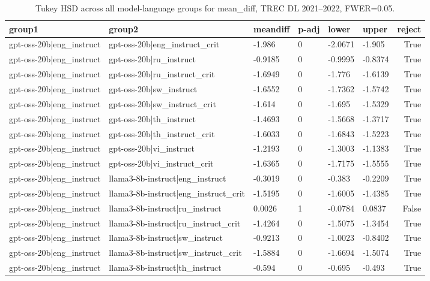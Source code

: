 \begin{table}
\caption{Tukey HSD across all model-language groups for mean_diff, TREC DL 2021--2022, FWER=0.05.}
\label{tab:tukey_all_models_all_langs_2021_2022_mean_diff}
\begin{tabular}{llllllr}
\toprule
group1 & group2 & meandiff & p-adj & lower & upper & reject \\
\midrule
gpt-oss-20b|eng_instruct & gpt-oss-20b|eng_instruct_crit & -1.986 & 0 & -2.0671 & -1.905 & True \\
gpt-oss-20b|eng_instruct & gpt-oss-20b|ru_instruct & -0.9185 & 0 & -0.9995 & -0.8374 & True \\
gpt-oss-20b|eng_instruct & gpt-oss-20b|ru_instruct_crit & -1.6949 & 0 & -1.776 & -1.6139 & True \\
gpt-oss-20b|eng_instruct & gpt-oss-20b|sw_instruct & -1.6552 & 0 & -1.7362 & -1.5742 & True \\
gpt-oss-20b|eng_instruct & gpt-oss-20b|sw_instruct_crit & -1.614 & 0 & -1.695 & -1.5329 & True \\
gpt-oss-20b|eng_instruct & gpt-oss-20b|th_instruct & -1.4693 & 0 & -1.5668 & -1.3717 & True \\
gpt-oss-20b|eng_instruct & gpt-oss-20b|th_instruct_crit & -1.6033 & 0 & -1.6843 & -1.5223 & True \\
gpt-oss-20b|eng_instruct & gpt-oss-20b|vi_instruct & -1.2193 & 0 & -1.3003 & -1.1383 & True \\
gpt-oss-20b|eng_instruct & gpt-oss-20b|vi_instruct_crit & -1.6365 & 0 & -1.7175 & -1.5555 & True \\
gpt-oss-20b|eng_instruct & llama3-8b-instruct|eng_instruct & -0.3019 & 0 & -0.383 & -0.2209 & True \\
gpt-oss-20b|eng_instruct & llama3-8b-instruct|eng_instruct_crit & -1.5195 & 0 & -1.6005 & -1.4385 & True \\
gpt-oss-20b|eng_instruct & llama3-8b-instruct|ru_instruct & 0.0026 & 1 & -0.0784 & 0.0837 & False \\
gpt-oss-20b|eng_instruct & llama3-8b-instruct|ru_instruct_crit & -1.4264 & 0 & -1.5075 & -1.3454 & True \\
gpt-oss-20b|eng_instruct & llama3-8b-instruct|sw_instruct & -0.9213 & 0 & -1.0023 & -0.8402 & True \\
gpt-oss-20b|eng_instruct & llama3-8b-instruct|sw_instruct_crit & -1.5884 & 0 & -1.6694 & -1.5074 & True \\
gpt-oss-20b|eng_instruct & llama3-8b-instruct|th_instruct & -0.594 & 0 & -0.695 & -0.493 & True \\

\end{tabular}
\end{table}
